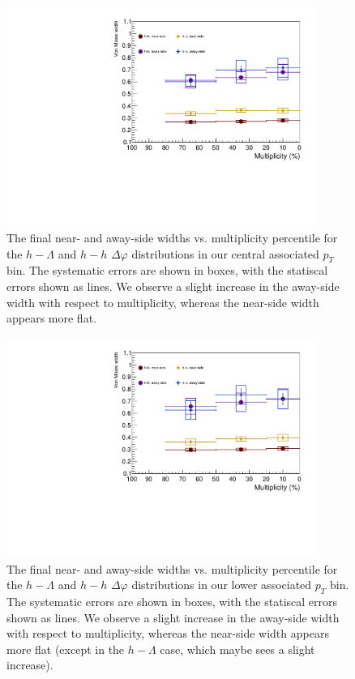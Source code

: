 \documentclass[ALICE,manyauthors]{ALICE_analysis_notes}
\begin{document}
\begin{figure}[ht]
\centering
\includegraphics[width=4in]{figures/von_mises_widths.pdf}
\caption{The final near- and away-side widths vs. multiplicity percentile for the $h-\Lambda$ and $h-h$ $\Delta\varphi$ distributions in our central associated $p_{T}$ bin. The systematic errors are shown in boxes, with the statiscal errors shown as lines. We observe a slight increase in the away-side width with respect to multiplicity, whereas the near-side width appears more flat.}
\label{width_vs_mult}
\end{figure}

\begin{figure}[ht]
\centering
\includegraphics[width=4in]{figures/von_mises_widths_lowpt.pdf}
\caption{The final near- and away-side widths vs. multiplicity percentile for the $h-\Lambda$ and $h-h$ $\Delta\varphi$ distributions in our lower associated $p_{T}$ bin. The systematic errors are shown in boxes, with the statiscal errors shown as lines. We observe a slight increase in the away-side width with respect to multiplicity, whereas the near-side width appears more flat (except in the $h-\Lambda$ case, which maybe sees a slight increase).}
\label{width_vs_mult_lowpt}
\end{figure}
\end{document}
